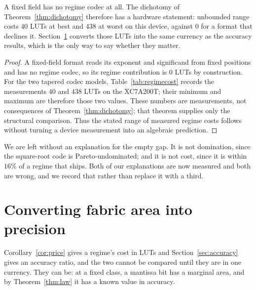 \begin{corollary}
\label{cor:price}
A fixed field has no regime codec at all. The dichotomy of
Theorem~\ref{thm:dichotomy} therefore has a hardware statement: unbounded range
costs $40$ LUTs at best and $438$ at worst on this device, against $0$ for a
format that declines it. Section~\ref{sec:convert} converts those LUTs into the
same currency as the accuracy results, which is the only way to say whether they
matter.
\end{corollary}
\begin{proof}
A fixed-field format reads its exponent and significand from fixed positions and
has no regime codec, so its regime contribution is $0$ LUTs by construction.
For the two tapered codec models, Table~\ref{tab:regimecost} records the
measurements $40$ and $438$ LUTs on the XC7A200T; their minimum and maximum are
therefore those two values. These numbers are measurements, not consequences of
Theorem~\ref{thm:dichotomy}; that theorem supplies only the structural comparison.
Thus the stated range of measured regime costs follows without turning a device
measurement into an algebraic prediction.
\end{proof}

We are left without an explanation for the empty gap. It is not domination, since
the square-root code is Pareto-undominated; and it is not cost, since it is within
$16\%$ of a regime that ships. Both of our explanations are now measured and both
are wrong, and we record that rather than replace it with a third.


\section{Converting fabric area into precision}\label{sec:convert}



Corollary~\ref{cor:price} gives a regime's cost in LUTs and Section~\ref{sec:accuracy}
gives an accuracy ratio, and the two cannot be compared until they are in one
currency. They can be: at a fixed class, a mantissa bit has a marginal area, and
by Theorem~\ref{thm:law} it has a known value in accuracy.

